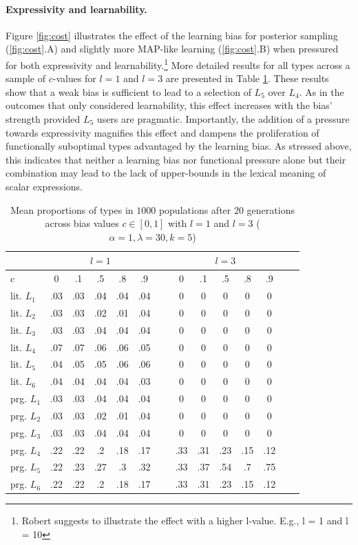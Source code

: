 \documentclass[a4paper]{article}
\newcommand{\hl}[1]{\textcolor[rgb]{.8,.33,.0}{#1}}%
\begin{document}
\paragraph{Expressivity and learnability.} Figure \ref{fig:cost} illustrates the effect of the learning bias for posterior sampling (\ref{fig:cost}.A) and slightly more MAP-like learning (\ref{fig:cost}.B) when pressured for both expressivity and learnability.\footnote{\hl{Robert suggests to illustrate the effect with a higher l-value. E.g., l = 1 and l = 10}} More detailed results for all types across a sample of $c$-values for $l = 1$ and $l = 3$ are presented in Table \ref{tab:numeric-results}. These results show that a weak bias is sufficient to lead to a selection of $L_5$ over $L_4$. As in the outcomes that only considered learnability, this effect increases with the bias' strength provided $L_5$ users are pragmatic. Importantly, the addition of a pressure towards expressivity magnifies this effect and dampens the proliferation of functionally suboptimal types advantaged by the learning bias. As stressed above, this indicates that neither a learning bias nor functional pressure alone but their combination may lead to the lack of upper-bounds in the lexical meaning of scalar expressions.


\begin{table}
\centering 
\begin{tabular}{l | c c c c c| c c c c c c c c}
\multicolumn{1}{c}{~} & \multicolumn{5}{c}{$l = 1$} & ~ & \multicolumn{5}{c}{$l = 3$}\\ \hline \hline
  c        &  0  & .1  & .5  & .8  & .9 & ~ & 0 & .1 & .5 & .8 & .9\\ \hline \hline
lit. $L_1$ & .03 & .03 & .04 & .04 & .04& ~ & 0 &0 & 0 & 0 & 0\\ 
lit. $L_2$ & .03 & .03 & .02 & .01 & .04& ~ & 0& 0 & 0 & 0 & 0\\
lit. $L_3$ & .03 & .03 & .04 & .04 & .04& ~ & 0& 0 & 0 & 0 & 0\\
lit. $L_4$ & .07 & .07 & .06 & .06 & .05& ~ & 0& 0 & 0 & 0 & 0\\
lit. $L_5$ & .04 & .05 & .05 & .06 & .06& ~ & 0& 0 & 0 & 0 & 0\\
lit. $L_6$ & .04 & .04 & .04 & .04 & .03& ~ & 0& 0 & 0 & 0 & 0\\ \hline
prg. $L_1$ & .03 & .03 & .04 & .04 & .04& ~ & 0& 0 & 0 & 0 & 0 \\
prg. $L_2$ & .03 & .03 & .02 & .01 & .04& ~ & 0& 0 & 0 & 0 & 0 \\
prg. $L_3$ & .03 & .03 & .04 & .04 & .04& ~ & 0& 0 & 0 & 0 & 0 \\ 
prg. $L_4$ & .22 & .22 & .2 & .18 & .17& ~ & .33& .31 & .23 & .15 & .12 \\
prg. $L_5$ & .22 & .23 & .27 & .3  & .32& ~ & .33& .37 & .54 & .7 & .75 \\
prg. $L_6$ & .22 & .22 & .2 & .18 & .17& ~ & .33& .31 & .23 & .15 & .12
\end{tabular}
\caption{Mean proportions of types in $1000$ populations after $20$ generations across bias values $c \in [0,1]$ with $l =1$ and $l = 3$ ($\alpha = 1, \lambda = 30, k = 5$)}%
\label{tab:numeric-results}
\end{table}
\end{document}
